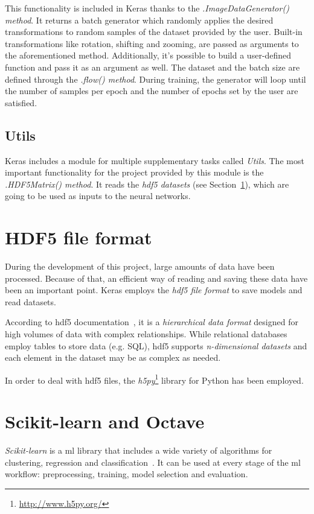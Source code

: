 This functionality is included in Keras thanks to the \emph{\textit{.ImageDataGenerator()} method}. It returns a batch generator which randomly applies the desired transformations to random samples of the dataset provided by the user. Built-in transformations like rotation, shifting and zooming, are passed as arguments to the aforementioned method. Additionally, it's possible to build a user-defined function and pass it as an argument as well. The dataset and the batch size are defined through the \emph{\textit{.flow()} method}. During training, the generator will loop until the number of samples per epoch and the number of epochs set by the user are satisfied.

\subsection{Utils}
Keras includes a module for multiple supplementary tasks called \emph{\textit{Utils}}. The most important functionality for the project provided by this module is the \emph{\textit{.HDF5Matrix()} method}. It reads the \emph{\gls{hdf5} datasets} (see Section~\ref{sec:hdf}), which are going to be used as inputs to the neural networks.

\section{HDF5 file format}\label{sec:hdf}
During the development of this project, large amounts of data have been processed. Because of that, an efficient way of reading and saving these data have been an important point. Keras employs the \emph{\gls{hdf5} file format} to save models and read datasets.

According to \gls{hdf5} documentation~\cite{hdf5}, it is a \emph{hierarchical data format} designed for high volumes of data with complex relationships. While relational databases employ tables to store data (e.g. SQL), \gls{hdf5} supports \emph{n-dimensional datasets} and each element in the dataset may be as complex as needed.

In order to deal with \gls{hdf5} files, the \emph{h5py}\footnote{\url{http://www.h5py.org/}} library for Python has been employed.

\section{Scikit-learn and Octave}\label{sec:skoctave}
\emph{Scikit-learn} is a \gls{ml} library that includes a wide variety of algorithms for clustering, regression and classification~\cite{scikit-learn}. It can be used at every stage of the \gls{ml} workflow: preprocessing, training, model selection and evaluation.

